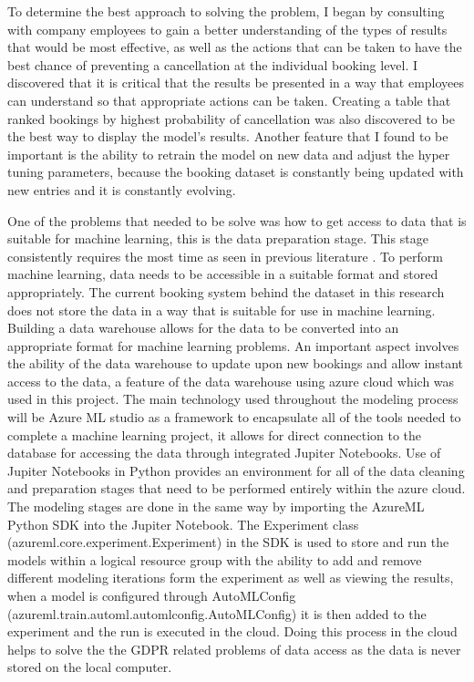 \vspace{5mm}

To determine the best approach to solving the problem, I began by consulting with company employees to gain a better understanding of the types of results that would be most effective, as well as the actions that can be taken to have the best chance of preventing a cancellation at the individual booking level. I discovered that it is critical that the results be presented in a way that employees can understand so that appropriate actions can be taken. Creating a table that ranked bookings by highest probability of cancellation was also discovered to be the best way to display the model's results. Another feature that I found to be important is the ability to retrain the model on new data and adjust the hyper tuning parameters, because the booking dataset is constantly being updated with new entries and it is constantly evolving.

\vspace{5mm}

One of the problems that needed to be solve was how to get access to data that is suitable for machine learning, this is the data preparation stage. This stage consistently requires the most time as seen in previous literature \cite{Zhang2003DataMining}. To perform machine learning, data needs to be accessible in a suitable format and stored appropriately. The current booking system behind the dataset in this research does not store the data in a way that is suitable for use in machine learning. Building a data warehouse allows for the data to be converted into an appropriate format for machine learning problems. An important aspect involves the ability of the data warehouse to update upon new bookings and allow instant access to the data, a feature of the data warehouse using azure cloud which was used in this project. The main technology used throughout the modeling process will be Azure ML studio as a framework to encapsulate all of the tools needed to complete a machine learning project, it allows for direct connection to the database for accessing the data through integrated Jupiter Notebooks. Use of Jupiter Notebooks in Python provides an environment for all of the data cleaning and preparation stages that need to be performed entirely within the azure cloud. The modeling stages are done in the same way by importing the AzureML Python SDK into the Jupiter Notebook. The Experiment class (azureml.core.experiment.Experiment) in the SDK is used to store and run the models within a logical resource group with the ability to add and remove different modeling iterations form the experiment as well as viewing the results, when a model is configured through AutoMLConfig (azureml.train.automl.automlconfig.AutoMLConfig) it is then added to the experiment and the run is executed in the cloud. Doing this process in the cloud helps to solve the the GDPR related problems of data access as the data is never stored on the local computer.

